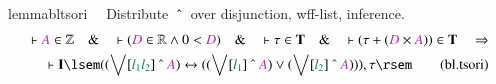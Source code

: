 \begin{restatable}{lemma}{bltsori}~~ Distribute $~\string^~$ over disjunction,
wff-list, inference.
\begin{align}
\vdash \mc{A} \in \mathbb{Z}\quad\&\quad \vdash ( \mc{D} \in \mathbb{R} \wedge
    0 < \mc{D} )\quad\&\quad \vdash \tau \in \mathbf{T}\quad\&\quad \vdash (
    \tau + ( \mc{D} \times \mc{A} ) ) \in \mathbf{T}\quad\Rightarrow \notag \\ %
     \quad \vdash
    \mathbf{I} \lsem ( ( \bigvee[ \mwl{l_1} \mwl{l_2} ] ~\string^~ \mc{A} )
    \leftrightarrow ( ( \bigvee[ \mwl{l_1} ] ~\string^~ \mc{A} ) \vee (
    \bigvee[ \mwl{l_2} ] ~\string^~ \mc{A} ) ) ) , \tau
    \rsem\label{eq:bl.tsori}\tag{bl.tsori}
\end{align}
\end{restatable}

